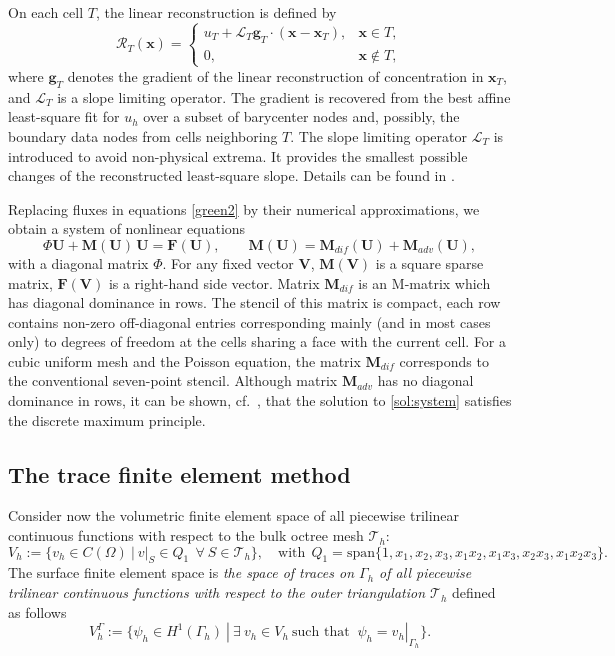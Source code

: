 \documentclass{article}
\newcommand{\bM}{\mathbf M}
\newcommand{\bV}{\mathbf V}
\newcommand{\bU}{\mathbf U}
\newcommand{\bF}{\mathbf F}
\newcommand{\bg}{\mathbf g}
\newcommand{\bx}{\mathbf x}
\newcommand{\cL}{\mathcal L}
\newcommand{\cR}{\mathcal R}
\begin{document}
On each cell $T$, the linear reconstruction is defined by
\begin{equation}\label{reconst}
\cR_T (\bx) = \left\{ \begin{array}{ll} u_T + \cL_T \bg_T \cdot (\bx-\bx_{T}), & \bx\in T, \\
                                       0, & \bx\notin T, \end{array} \right.
\end{equation}
where $\bg_T$ denotes the gradient of the  linear reconstruction of concentration in $\bx_T$, and $\cL_T$ is a slope limiting operator. The gradient is recovered from the best affine least-square fit for $u_h$ over a subset of barycenter nodes and, possibly, the boundary data nodes from cells neighboring $T$.
The slope limiting operator $\cL_T$ is introduced to avoid non-physical extrema. It provides the smallest possible changes of the reconstructed least-square slope. Details can be found in  \cite{Lipnikov:10,Lipnikov:12,NikitinVassilevski:10}.


Replacing fluxes in equations \eqref{green2} by their numerical approximations, we
obtain a system of nonlinear equations
\begin{equation} \label{sol:system}
  \Phi\bU+ \bM(\bU)\, \bU = \bF(\bU),
  \qquad
  \bM(\bU) = \bM_{dif}(\bU) + \bM_{adv}(\bU),
\end{equation}
with a diagonal matrix $\Phi$. For any fixed vector $\bV$, $\bM(\bV)$ is a square sparse matrix,  $\bF(\bV)$ is a right-hand side vector.
Matrix $\bM_{dif}$ is an M-matrix which has  diagonal dominance in rows.
The stencil of this matrix is compact, each row contains non-zero off-diagonal entries corresponding mainly (and in most cases only) to degrees of freedom at the cells sharing a face with the current cell.
 For a  cubic uniform mesh and the Poisson equation, the matrix $\bM_{dif}$ corresponds to the conventional seven-point stencil.
Although matrix $\bM_{adv}$ has no diagonal dominance in rows,
it can be shown, cf.~\cite{Lipnikov:12}, that the solution to \eqref{sol:system}
satisfies the discrete maximum principle.


\subsection{The trace finite element method} \label{s_FEM}

Consider now the volumetric finite element space of all piecewise trilinear continuous functions with respect to the bulk octree mesh $\mathcal{T}_h$:
\begin{equation}
 V_h:=\{v_h\in C(\Omega)\ |\ v|_{S}\in Q_1~~ \forall\ S \in\mathcal{T}_h\},\quad\text{with}~~
 Q_1=\mbox{span}\{1,x_1,x_2,x_3,x_1x_2,x_1x_3,x_2x_3,x_1x_2x_3\}.
 \label{e:2.6}
\end{equation}
The surface finite element space is \textit{the space of traces on $\Gamma_h$ of all piecewise trilinear continuous functions with respect to the outer triangulation $\mathcal{T}_h$}  defined as follows
\begin{equation}
 V_h^{\Gamma}:=\{\psi_h\in H^1(\Gamma_h)\ |\ \exists ~ v_h\in V_h\  \text{such that }\ \psi_h=v_h|_{\Gamma_h}\}.
\label{e:fem-space}
\end{equation}
\end{document}
